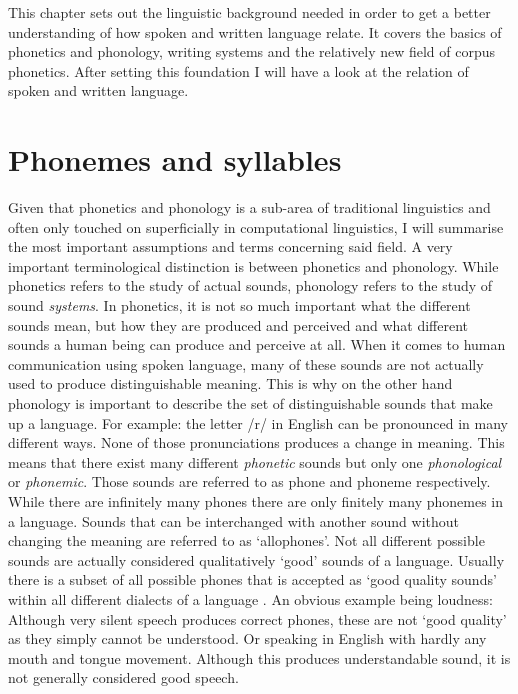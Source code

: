 \label{chap:ling-background}

This chapter sets out the linguistic background needed in order to get a better understanding of how spoken and written language relate. It covers the basics of phonetics and phonology, writing systems and the relatively new field of corpus phonetics. After setting this foundation I will have a look at the relation of spoken and written language. 


\section{Phonemes and syllables}
\label{phonology}
Given that phonetics and phonology is a sub-area of traditional linguistics and often only touched on superficially in computational linguistics, I will summarise the most important assumptions and terms concerning said field. A very important terminological distinction is between phonetics and phonology. While phonetics refers to the study of actual sounds, phonology refers to the study of sound \textit{systems}. In phonetics, it is not so much important what the different sounds mean, but how they are produced and perceived and what different sounds a human being can produce and perceive at all. When it comes to human communication using spoken language, many of these sounds are not actually used to produce distinguishable meaning. This is why on the other hand phonology is important to describe the set of distinguishable sounds that make up a language. For example: the letter /r/ in English can be pronounced in many different ways. None of those pronunciations produces a change in meaning. This means that there exist many different \textit{phonetic} sounds but only one \textit{phonological} or \textit{phonemic}. Those sounds are referred to as phone and phoneme respectively. While there are infinitely many phones there are only finitely many phonemes in a language. Sounds that can be interchanged with another sound without changing the meaning are referred to as `allophones'. Not all different possible sounds are actually considered qualitatively `good' sounds of a language. Usually there is a subset of all possible phones that is accepted as `good quality sounds' within all different dialects of a language \citep{Intro.2007}. An obvious example being loudness: Although very silent speech produces correct phones, these are not `good quality' as they simply cannot be understood. Or speaking in English with hardly any mouth and tongue movement. Although this produces understandable sound, it is not generally considered good speech. 


